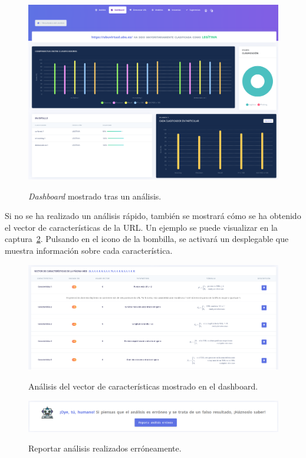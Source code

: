 \begin{figure}[h]
	\caption[Manual de usuario: gráficas del \textit{dashboard}]{\textit{Dashboard} mostrado tras un análisis.}
	\centering
	\includegraphics[width=\textwidth]{../img/anexos/user_guide/3_dashboard_1}
	\label{e-3:dashboard-1}
\end{figure}

Si no se ha realizado un análisis rápido, también se mostrará cómo se ha obtenido el vector de características de la URL. Un ejemplo se puede visualizar en la captura~\ref{e-3:dashboard-2}. Pulsando en el icono de la bombilla, se activará un desplegable que muestra información sobre cada característica.

\begin{figure}[h]
	\caption[Manual de usuario: vector de características en el \textit{dashboard}]{Análisis del vector de características mostrado en el dashboard.}
	\centering
	\includegraphics[width=\textwidth]{../img/anexos/user_guide/3_dashboard_2}
	\label{e-3:dashboard-2}
\end{figure}

\begin{figure}[h]
	\caption[Manual de usuario: reportar análisis erróneo]{Reportar análisis realizados erróneamente.}
	\centering
	\includegraphics[width=\textwidth]{../img/anexos/user_guide/3_report_false_analysis}
	\label{e-3:report-false-analysis}
\end{figure}

